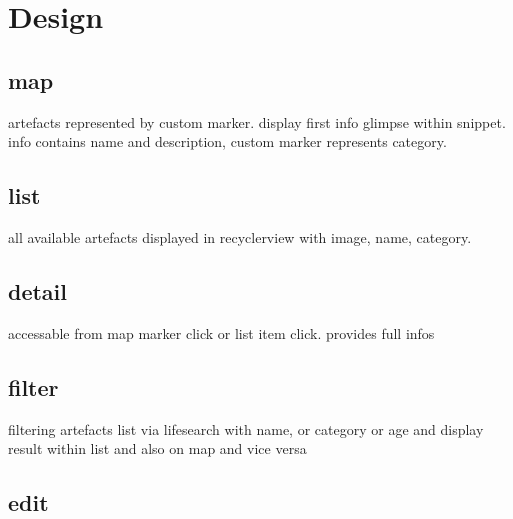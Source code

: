 \newpage
\chapter{Design}\label{cap:Design}

\section{map}

artefacts represented by custom marker. display first info glimpse within snippet. info contains name and description, custom marker represents category.

\section{list}
all available artefacts displayed in recyclerview with image, name, category.

\section{detail}
accessable from map marker click or list item click. provides full infos

\section{filter}
filtering artefacts list via lifesearch with name, or category or age and display result within list and also on map and vice versa

\section{edit}


